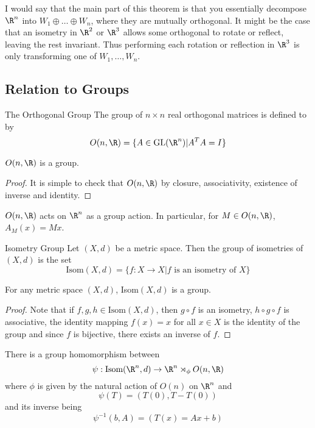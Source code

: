 I would say that the main part of this theorem is that you essentially decompose $\R^n$ into $W_1\oplus\dots\oplus W_n$, where they are mutually orthogonal. It might be the case that an isometry in $\R^2$ or $\R^3$ allows some orthogonal to rotate or reflect, leaving the rest invariant. Thus performing each rotation or reflection in $\R^3$ is only transforming one of $W_1,\dots,W_n$. 

\subsection{Relation to Groups}
\begin{defn}{The Orthogonal Group}{} The group of $n\times n$ real orthogonal matrices is defined to by $$O(n,\R)=\{A\in\text{GL}(\R^n)|A^TA=I\}$$
\end{defn}

\begin{lmm}{}{} $O(n,\R)$ is a group. \tcbline
\begin{proof} It is simple to check that $O(n,\R)$ by closure, associativity, existence of inverse and identity. 
\end{proof}
\end{lmm}

\begin{prp}{}{} $O(n,\R)$ acts on $\R^n$ as a group action. In particular, for $M\in O(n,\R)$, $A_M(x)=Mx$. 
\end{prp}

\begin{defn}{Isometry Group}{} Let $(X,d)$ be a metric space. Then the group of isometries of $(X,d)$ is the set $$\text{Isom}(X,d)=\{f:X\to X|f \text{ is an isometry of }X\}$$
\end{defn}

\begin{lmm}{}{} For any metric space $(X,d)$, Isom$(X,d)$ is a group. \tcbline
\begin{proof} Note that if $f,g,h\in\text{Isom}(X,d)$, then $g\circ f$ is an isometry, $h\circ g\circ f$ is associative, the identity mapping $f(x)=x$ for all $x\in X$ is the identity of the group and since $f$ is bijective, there exists an inverse of $f$. 
\end{proof}
\end{lmm}

\begin{thm}{}{} There is a group homomorphism between $$\psi:\text{Isom}(\R^n,d)\to \R^n\rtimes_\phi O(n,\R)$$ where $\phi$ is given by the natural action of $O(n)$ on $\R^n$ and $$\psi(T)=(T(0),T-T(0))$$ and its inverse being $$\psi^{-1}(b,A)=\left(T(x)=Ax+b\right)$$
\end{thm}

